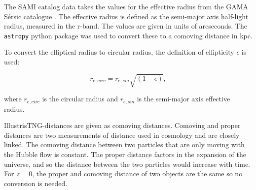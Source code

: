 The SAMI catalog data takes the values for the effective radius from the GAMA Sérsic catalogue \parencite{Kelvin2012}. The effective radius is defined as the semi-major axis half-light radius, measured in the r-band. The values are given in units of arcseconds. The \texttt{astropy} python package was used to convert these to a comoving distance in kpc.


To convert the elliptical radius to circular radius, the definition of ellipticity $\epsilon$ is used:

\begin{equation}
   r_{e, circ} = r_{e,sm}\sqrt{(1-\epsilon)},
\end{equation}

where $r_{e, circ}$ is the circular radius and $r_{e,sm}$ is the semi-major axis effective radius.

IllustrisTNG-distances are given as comoving distances. Comoving and proper distances are two measurements of distance used in cosmology and are closely linked. The comoving distance between two particles that are only moving with the Hubble flow is constant. The proper distance factors in the expansion of the universe, and so the distance between the two particles would increase with time. For $z=0$, the proper and comoving distance of two objects are the same so no conversion is needed.
